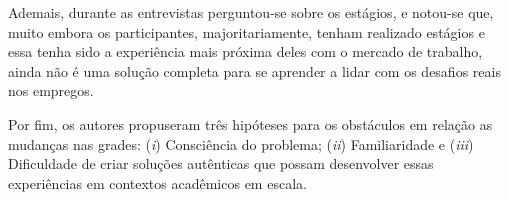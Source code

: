 \documentclass[12pt, a4paper]{article}
\newcommand{\tit}[1]{\textit{#1}}
\newcommand{\iitem}[1]{(\tit{#1})}
\begin{document}
    Ademais, durante as entrevistas perguntou-se sobre os estágios, e notou-se que, muito embora os participantes, majoritariamente, tenham realizado estágios e essa tenha sido a experiência mais próxima deles com o mercado de trabalho, ainda não é uma solução completa para se aprender a lidar com os desafios reais nos empregos.
    
    Por fim, os autores propuseram três hipóteses para os obstáculos em relação as mudanças nas grades: \iitem{i} Consciência do problema; \iitem{ii} Familiaridade e \iitem{iii} Dificuldade de criar soluções autênticas que possam desenvolver essas experiências em contextos acadêmicos em escala.
    
\end{document}
